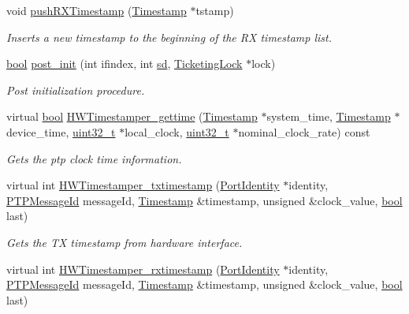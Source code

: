 \begin{DoxyCompactItemize}
void \hyperlink{class_linux_timestamper_generic_a502ddb4d27b9cf57a9612fe74def2404}{push\+R\+X\+Timestamp} (\hyperlink{class_timestamp}{Timestamp} $\ast$tstamp)
\begin{DoxyCompactList}\small\item\em Inserts a new timestamp to the beginning of the RX timestamp list. \end{DoxyCompactList}\item 
\hyperlink{avb__gptp_8h_af6a258d8f3ee5206d682d799316314b1}{bool} \hyperlink{class_linux_timestamper_generic_aeada5965d363813719d4b3e0c6ba209e}{post\+\_\+init} (int ifindex, int \hyperlink{class_linux_timestamper_generic_a06b0afe769d54ae94259d8532bc878b0}{sd}, \hyperlink{class_ticketing_lock}{Ticketing\+Lock} $\ast$lock)
\begin{DoxyCompactList}\small\item\em Post initialization procedure. \end{DoxyCompactList}\item 
virtual \hyperlink{avb__gptp_8h_af6a258d8f3ee5206d682d799316314b1}{bool} \hyperlink{class_linux_timestamper_generic_ab8370a996dbc05b111b5d8f888a87648}{H\+W\+Timestamper\+\_\+gettime} (\hyperlink{class_timestamp}{Timestamp} $\ast$system\+\_\+time, \hyperlink{class_timestamp}{Timestamp} $\ast$device\+\_\+time, \hyperlink{parse_8c_a6eb1e68cc391dd753bc8ce896dbb8315}{uint32\+\_\+t} $\ast$local\+\_\+clock, \hyperlink{parse_8c_a6eb1e68cc391dd753bc8ce896dbb8315}{uint32\+\_\+t} $\ast$nominal\+\_\+clock\+\_\+rate) const 
\begin{DoxyCompactList}\small\item\em Gets the ptp clock time information. \end{DoxyCompactList}\item 
virtual int \hyperlink{class_linux_timestamper_generic_a8ca092c3a907618eebf1d512de28db18}{H\+W\+Timestamper\+\_\+txtimestamp} (\hyperlink{class_port_identity}{Port\+Identity} $\ast$identity, \hyperlink{class_p_t_p_message_id}{P\+T\+P\+Message\+Id} message\+Id, \hyperlink{class_timestamp}{Timestamp} \&timestamp, unsigned \&clock\+\_\+value, \hyperlink{avb__gptp_8h_af6a258d8f3ee5206d682d799316314b1}{bool} last)
\begin{DoxyCompactList}\small\item\em Gets the TX timestamp from hardware interface. \end{DoxyCompactList}\item 
virtual int \hyperlink{class_linux_timestamper_generic_a9dc0ab7dd51322bf334ba8fe1d4e77a9}{H\+W\+Timestamper\+\_\+rxtimestamp} (\hyperlink{class_port_identity}{Port\+Identity} $\ast$identity, \hyperlink{class_p_t_p_message_id}{P\+T\+P\+Message\+Id} message\+Id, \hyperlink{class_timestamp}{Timestamp} \&timestamp, unsigned \&clock\+\_\+value, \hyperlink{avb__gptp_8h_af6a258d8f3ee5206d682d799316314b1}{bool} last)

\end{DoxyCompactItemize}
